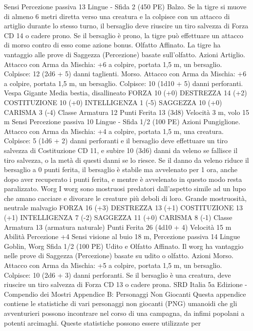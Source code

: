\begin{multicols}{2}
Sensi Percezione passiva 13
Lingue -
Sfida 2 (450 PE)
Balzo. Se la tigre si muove di almeno 6 metri diretta verso una
creatura e la colpisce con un attacco di artiglio durante lo stesso
turno, il bersaglio deve riuscire un tiro salvezza di Forza CD 14 o
cadere prono. Se il bersaglio è prono, la tigre può effettuare un
attacco di morso contro di esso come azione bonus.
Olfatto Affinato. La tigre ha vantaggio alle prove di Saggezza
(Percezione) basate sull’olfatto.
Azioni
Artiglio. Attacco con Arma da Mischia: +6 a colpire, portata 1,5
m, un bersaglio.
Colpisce: 12 (2d6 + 5) danni taglienti.
Morso. Attacco con Arma da Mischia: +6 a colpire, portata 1,5
m, un bersaglio.
Colpisce: 10 (1d10 + 5) danni perforanti.
Vespa Gigante
Media bestia, disallineato
FORZA 10 (+0)
DESTREZZA 14 (+2)
COSTITUZIONE 10 (+0)
INTELLIGENZA 1 (-5)
SAGGEZZA 10 (+0)
CARISMA 3 (-4)
Classe Armatura 12
Punti Ferita 13 (3d8)
Velocità 3 m, volo 15 m
Sensi Percezione passiva 10
Lingue -
Sfida 1/2 (100 PE)
Azioni
Pungiglione. Attacco con Arma da Mischia: +4 a colpire, portata
1,5 m, una creatura.
Colpisce: 5 (1d6 + 2) danni perforanti e il bersaglio deve
effettuare un tiro salvezza di Costituzione CD 11, e subire 10
(3d6) danni da veleno se fallisce il tiro salvezza, o la metà di
questi danni se lo riesce. Se il danno da veleno riduce il bersaglio
a 0 punti ferita, il bersaglio è stabile ma avvelenato per 1 ora,
anche dopo aver recuperato i punti ferita, e mentre è avvelenato
in questo modo resta paralizzato.
Worg
I worg sono mostruosi predatori dall’aspetto simile ad
un lupo che amano cacciare e divorare le creature più
deboli di loro.
Grande mostruosità, neutrale malvagio
FORZA 16 (+3)
DESTREZZA 13 (+1)
COSTITUZIONE 13 (+1)
INTELLIGENZA 7 (-2)
SAGGEZZA 11 (+0)
CARISMA 8 (-1)
Classe Armatura 13 (armatura naturale)
Punti Ferita 26 (4d10 + 4)
Velocità 15 m
Abilità Percezione +4
Sensi visione al buio 18 m, Percezione passiva 14
Lingue Goblin, Worg
Sfida 1/2 (100 PE)
Udito e Olfatto Affinato. Il worg ha vantaggio nelle prove di
Saggezza (Percezione) basate su udito o olfatto.
Azioni
Morso. Attacco con Arma da Mischia: +5 a colpire, portata 1,5
m, un bersaglio.
Colpisce: 10 (2d6 + 3) danni perforanti. Se il bersaglio è una
creatura, deve riuscire un tiro salvezza di Forza CD 13 o cadere
prona.
SRD Italia 5a Edizione - Compendio dei Mostri
Appendice B:
Personaggi Non
Giocanti
Questa appendice contiene le statistiche di vari
personaggi non giocanti (PNG) umanoidi che gli
avventurieri possono incontrare nel corso di una
campagna, da infimi popolani a potenti arcimaghi.
Queste statistiche possono essere utilizzate per

\end{multicols}
